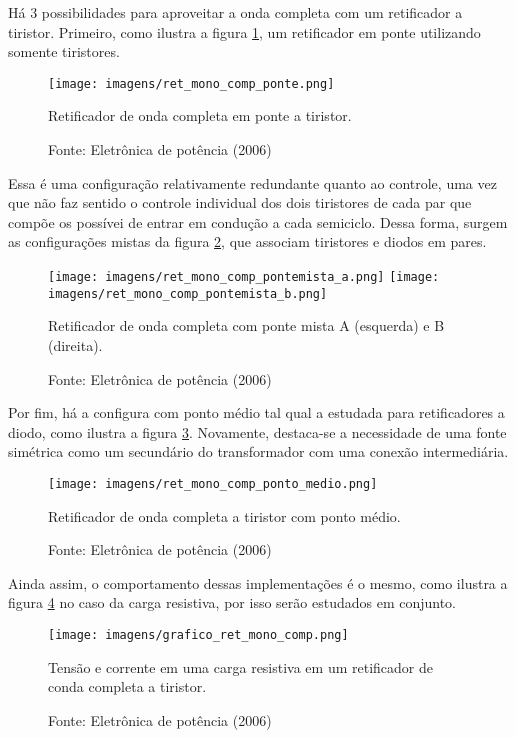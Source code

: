 Há 3 possibilidades para aproveitar a onda completa com um retificador a tiristor. Primeiro, como ilustra a figura \ref{pc}, um retificador em ponte utilizando somente tiristores.

\begin{figure}[h]
\center
\texttt{[image: imagens/ret\_mono\_comp\_ponte.png]}
\caption{Retificador de onda completa em ponte a tiristor.}\label{pc}
\caption*{Fonte: Eletrônica de potência (2006)}
\end{figure}

Essa é uma configuração relativamente redundante quanto ao controle, uma vez que não faz sentido o controle individual dos dois tiristores de cada par que compõe os possívei de entrar em condução a cada semiciclo. Dessa forma, surgem as configurações mistas da figura \ref{pma}, que associam tiristores e diodos em pares.

\begin{figure}[h]
\center
\texttt{[image: imagens/ret\_mono\_comp\_pontemista\_a.png]}
\texttt{[image: imagens/ret\_mono\_comp\_pontemista\_b.png]}
\caption{Retificador de onda completa com ponte mista A (esquerda) e B (direita).}\label{pma}
\caption*{Fonte: Eletrônica de potência (2006)}
\end{figure}

Por fim, há a configura com ponto médio tal qual a estudada para retificadores a diodo, como ilustra a figura \ref{pmed}. Novamente, destaca-se a necessidade de uma fonte simétrica como um secundário do transformador com uma conexão intermediária.

\begin{figure}[h]
\center
\texttt{[image: imagens/ret\_mono\_comp\_ponto\_medio.png]}
\caption{Retificador de onda completa a tiristor com ponto médio.}\label{pmed}
\caption*{Fonte: Eletrônica de potência (2006)}
\end{figure}

Ainda assim, o comportamento dessas implementações é o mesmo, como ilustra a figura \ref{gretr} no caso da carga resistiva, por isso serão estudados em conjunto.

\begin{figure}[h]
\center
\texttt{[image: imagens/grafico\_ret\_mono\_comp.png]}
\caption{Tensão e corrente em uma carga resistiva em um retificador de conda completa a tiristor.}\label{gretr}
\caption*{Fonte: Eletrônica de potência (2006)}
\end{figure}

